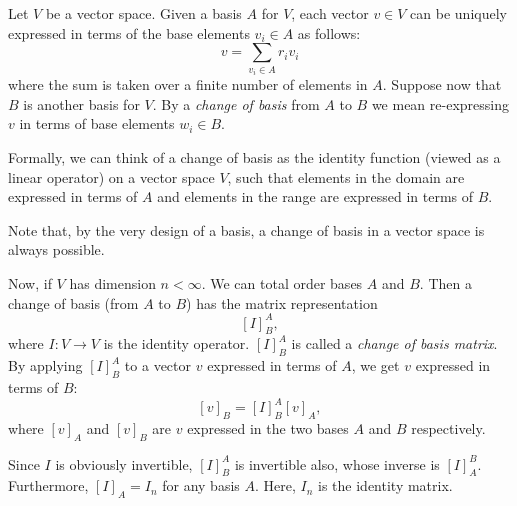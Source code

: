 \documentclass[12pt]{article}
\begin{document}
Let $V$ be a vector space.  Given a basis $A$ for $V$, each vector $v\in V$ can be uniquely expressed in terms of the base elements $v_i\in A$ as follows: $$v=\sum_{v_i\in A} r_iv_i$$ where the sum is taken over a finite number of elements in $A$.  Suppose now that $B$ is another basis for $V$.  By a \emph{change of basis} from $A$ to $B$ we mean re-expressing $v$ in terms of base elements $w_i\in B$.

Formally, we can think of a change of basis as the identity function (viewed as a linear operator) on a vector space $V$, such that elements in the domain are expressed in terms of $A$ and elements in the range are expressed in terms of $B$.

Note that, by the very design of a basis, a change of basis in a vector space is always possible.

Now, if $V$ has dimension $n<\infty$.  We can total order bases $A$ and $B$.  Then a change of basis (from $A$ to $B$) has the matrix representation $$[I]^A_B,$$ where $I:V\to V$ is the identity operator.  $[I]^A_B$ is called a \emph{change of basis matrix}.  By applying $[I]^A_B$ to a vector $v$ expressed in terms of $A$, we get $v$ expressed in terms of $B$:  $$[v]_B=[I]^A_B[v]_A,$$ where $[v]_A$ and $[v]_B$ are $v$ expressed in the two bases $A$ and $B$ respectively.  

Since $I$ is obviously invertible, $[I]^A_B$ is invertible also, whose inverse is $[I]^B_A$.  Furthermore, $[I]_A=I_n$ for any basis $A$.  Here, $I_n$ is the identity matrix.
\end{document}
